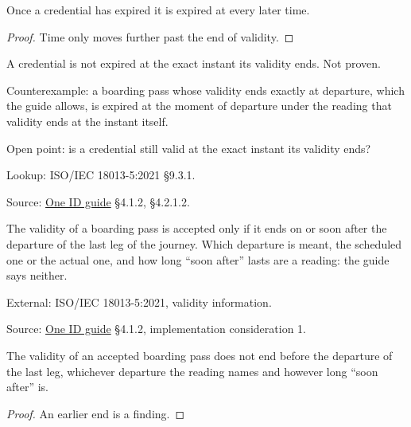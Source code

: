 \begin{theorem}
  \label{thm:expired-stays}
  Once a credential has expired it is expired at every later time.
\end{theorem}
\begin{proof}
  Time only moves further past the end of validity.
\end{proof}

\begin{theorem}
  \label{thm:valid-at-validuntil}
  A credential is not expired at the exact instant its validity ends.  Not
  proven.

  Counterexample: a boarding pass whose validity ends exactly at departure,
  which the guide allows, is expired at the moment of departure under the
  reading that validity ends at the instant itself.

  Open point: is a credential still valid at the exact instant its validity
  ends?

  Lookup: ISO/IEC 18013-5:2021 §9.3.1.

  Source: \href{https://standards.atlassian.net/wiki/spaces/OneID/pages/2947416082/Technical+Implementation+Guide}{One ID guide} §4.1.2, §4.2.1.2.
\end{theorem}

\begin{definition}
  \label{def:bp-validity}
  The validity of a boarding pass is accepted only if it ends on or soon
  after the departure of the last leg of the journey.  Which departure is
  meant, the scheduled one or the actual one, and how long ``soon after''
  lasts are a reading: the guide says neither.

  External: ISO/IEC 18013-5:2021, validity information.

  Source: \href{https://standards.atlassian.net/wiki/spaces/OneID/pages/2947416082/Technical+Implementation+Guide}{One ID guide} §4.1.2, implementation consideration 1.
\end{definition}

\begin{theorem}
  \label{thm:validity-reaches-departure}
  The validity of an accepted boarding pass does not end before the departure
  of the last leg, whichever departure the reading names and however long
  ``soon after'' is.
\end{theorem}
\begin{proof}
  An earlier end is a finding.
\end{proof}

